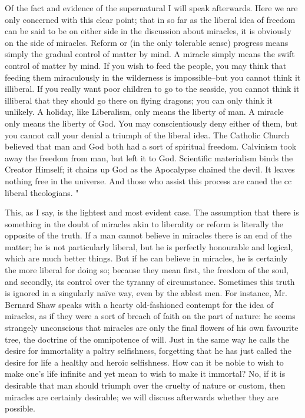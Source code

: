 \documentclass{book}
\begin{document}
Of the fact and evidence of the supernatural I will speak afterwards. Here we are only concerned with this clear point; that in so far as the liberal idea of freedom can be said to be on either side in the discussion about miracles, it is obviously on the side of miracles. Reform or (in the only tolerable sense) progress means simply the gradual control of matter by mind. A miracle simply means the swift control of matter by mind. If you wish to feed the people, you may think that feeding them miraculously in the wilderness is impossible–but you cannot think it illiberal. If you really want poor children to go to the seaside, you cannot think it illiberal that they should go there on flying dragons; you can only think it unlikely. A holiday, like Liberalism, only means the liberty of man. A miracle only means the liberty of God. You may conscientiously deny either of them, but you cannot call your denial a triumph of the liberal idea. The Catholic Church believed that man and God both had a sort of spiritual freedom. Calvinism took away the freedom from man, but left it to God. Scientific materialism binds the Creator Himself; it chains up God as the Apocalypse chained the devil. It leaves nothing free in the universe. And those who assist this process are caned the cc liberal theologians. "

This, as I say, is the lightest and most evident case. The assumption that there is something in the doubt of miracles akin to liberality or reform is literally the opposite of the truth. If a man cannot believe in miracles there is an end of the matter; he is not particularly liberal, but he is perfectly honourable and logical, which are much better things. But if he can believe in miracles, he is certainly the more liberal for doing so; because they mean first, the freedom of the soul, and secondly, its control over the tyranny of circumstance. Sometimes this truth is ignored in a singularly naïve way, even by the ablest men. For instance, Mr. Bernard Shaw speaks with a hearty old-fashioned contempt for the idea of miracles, as if they were a sort of breach of faith on the part of nature: he seems strangely unconscious that miracles are only the final flowers of his own favourite tree, the doctrine of the omnipotence of will. Just in the same way he calls the desire for immortality a paltry selfishness, forgetting that he has just called the desire for life a healthy and heroic selfishness. How can it be noble to wish to make one’s life infinite and yet mean to wish to make it immortal? No, if it is desirable that man should triumph over the cruelty of nature or custom, then miracles are certainly desirable; we will discuss afterwards whether they are possible.
\end{document}
